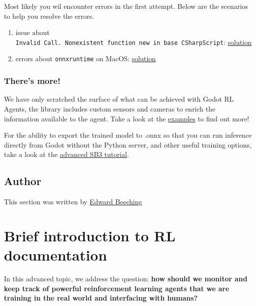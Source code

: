 \documentclass[11pt,a4paper]{article}
\begin{document}
Most likely you wil encounter errors in the first attempt. Below are the scenarios to help you resolve the errors.

\begin{enumerate}
\def\labelenumi{\arabic{enumi}.}
\item
  issue about \texttt{Invalid\ Call.\ Nonexistent\ function\ \textquotesingle{}new\textquotesingle{}\ in\ base\ \textquotesingle{}CSharpScript\textquotesingle{}}: \href{https://github.com/edbeeching/godot_rl_agents/blob/main/docs/TROUBLESHOOTING.md}{solution}
\item
  errors about \texttt{onnxruntime} on MacOS: \href{https://github.com/microsoft/onnxruntime/issues/9707}{solution}
\end{enumerate}

\subsubsection{There's more!}\label{theres-more}

We have only scratched the surface of what can be achieved with Godot RL Agents, the library includes custom sensors and cameras to enrich the information available to the agent. Take a look at the \href{https://github.com/edbeeching/godot_rl_agents_examples}{examples} to find out more!

For the ability to export the trained model to .onnx so that you can run inference directly from Godot without the Python server, and other useful training options, take a look at the \href{https://github.com/edbeeching/godot_rl_agents/blob/main/docs/ADV_STABLE_BASELINES_3.md}{advanced SB3 tutorial}.

\subsection{Author}\label{author-6}

This section was written by \href{https://twitter.com/edwardbeeching}{Edward Beeching}

\section{Brief introduction to RL documentation}\label{brief-introduction-to-rl-documentation}

In this advanced topic, we address the question: \textbf{how should we monitor and keep track of powerful reinforcement learning agents that we are training in the real world and interfacing with humans?}
\end{document}
